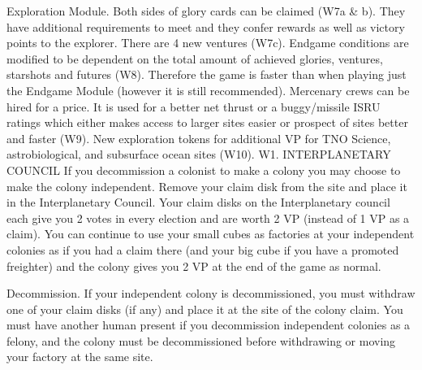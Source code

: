 \documentclass[a4paper]{book}
\begin{document}
Exploration Module. Both sides of glory cards can be claimed (W7a \& b). They have additional requirements to meet and they confer rewards as well as victory points to the explorer. There are 4 new ventures (W7c).
Endgame conditions are modified to be dependent on the total amount of achieved glories, ventures, starshots and futures (W8). Therefore the game is faster than when playing just the Endgame Module (however it is still recommended).
Mercenary crews can be hired for a price. It is used for a better net thrust or a buggy/missile ISRU ratings which either makes access to larger sites easier or prospect of sites better and faster (W9).
New exploration tokens for additional VP for TNO Science, astrobiological, and subsurface ocean sites (W10).
W1. INTERPLANETARY COUNCIL
If you decommission a colonist to make a colony you may choose to make the colony independent. Remove your claim disk from the site and place it in the Interplanetary Council. Your claim disks on the Interplanetary council each give you 2 votes in every election and are worth 2 VP (instead of 1 VP as a claim). You can continue to use your small cubes as factories at your independent colonies as if you had a claim there (and your big cube if you have a promoted freighter) and the colony gives you 2 VP at the end of the game as normal.

Decommission. If your independent colony is decommissioned, you must withdraw one of your claim disks (if any) and place it at the site of the colony claim. You must have another human present if you decommission independent colonies as a felony, and the colony must be decommissioned before withdrawing or moving your factory at the same site.
\end{document}
